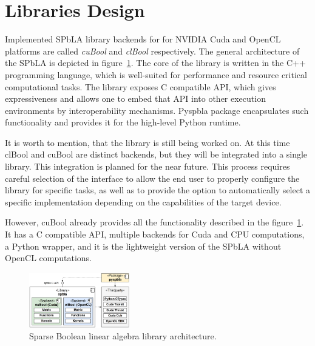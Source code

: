 \section{Libraries Design}



Implemented SPbLA library backends for  for NVIDIA Cuda and OpenCL platforms are called \textit{cuBool} and  \textit{clBool} respectively.
The general architecture of the SPbLA is depicted in figure~\ref{fig:generic_architecture}.
The core of the library is written in the C++ programming language, which is well-suited for performance and resource critical computational tasks.
The library exposes C compatible API, which gives expressiveness and allows one to embed that API into other execution environments by interoperability mechanisms.
Pyspbla package encapsulates such functionality and provides it for the high-level Python runtime.

It is worth to mention, that the library is still being worked on. At this time clBool and cuBool are distinct backends, but they will be integrated into a single library.
This integration is planned for the near future.
This process requires careful selection of the interface to allow the end user to properly configure the library for specific tasks, as well as to provide the option to automatically select a specific implementation depending on the capabilities of the target device. 

However, cuBool already provides all the functionality described in the figure~\ref{fig:generic_architecture}.
It has a C compatible API, multiple backends for Cuda and CPU computations, a Python wrapper, and it is the lightweight version of the SPbLA without OpenCL computations.

\begin{figure}[t]
    \centering
    \includegraphics[width=0.39\textwidth]{generic_architecture.png}
    \caption{Sparse Boolean linear algebra library architecture.}
    \label{fig:generic_architecture}
\end{figure}

